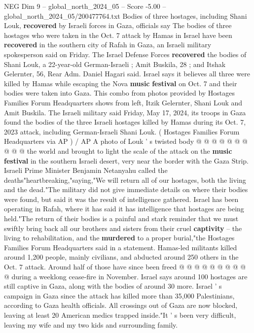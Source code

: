 \begin{textsample}{NEG Dim 9 – global\_north\_2024\_05 – Score -5.00 – global\_north\_2024\_05/200477764.txt}  \label{ex:f9_neg_239}
Bodies of three hostages, including Shani Louk, \textbf{recovered} by Israeli forces in Gaza, officials say The bodies of three hostages who were taken in the Oct. 7 attack by Hamas in Israel have been \textbf{recovered} in the southern city of Rafah in Gaza, an Israeli military spokesperson said on Friday.
The Israel Defense Forces \textbf{recovered} the bodies of Shani Louk, a 22-year-old German-Israeli ; Amit Buskila, 28 ; and Itshak Gelernter, 56, Rear Adm.
Daniel Hagari said.
Israel says it believes all three were killed by Hamas while escaping the Nova \textbf{music} \textbf{festival} on Oct. 7 and their bodies were taken into Gaza.
This combo from photos provided by Hostages Families Forum Headquarters shows from left, Itzik Gelernter, Shani Louk and Amit Buskila.
The Israeli military said Friday, May 17, 2024, its troops in Gaza found the bodies of the three Israeli hostages killed by Hamas during its Oct. 7, 2023 attack, including German-Israeli Shani Louk. ( Hostages Families Forum Headquarters via AP ) / AP A photo of Louk ' s twisted body @ @ @ @ @ @ @ @ @ @ the world and brought to light the scale of the attack on the \textbf{music} \textbf{festival} in the southern Israeli desert, very near the border with the Gaza Strip.
Israeli Prime Minister Benjamin Netanyahu called the deaths"heartbreaking,"saying,"We will return all of our hostages, both the living and the dead."The military did not give immediate details on where their bodies were found, but said it was the result of intelligence gathered.
Israel has been operating in Rafah, where it has said it has intelligence that hostages are being held."The return of their bodies is a painful and stark reminder that we must swiftly bring back all our brothers and sisters from their cruel \textbf{captivity} -- the living to rehabilitation, and the \textbf{murdered} to a proper burial,"the Hostages Families Forum Headquarters said in a statement.
Hamas-led militants killed around 1,200 people, mainly civilians, and abducted around 250 others in the Oct. 7 attack.
Around half of those have since been freed @ @ @ @ @ @ @ @ @ @ during a weeklong cease-fire in November.
Israel says around 100 hostages are still captive in Gaza, along with the bodies of around 30 more.
Israel ' s campaign in Gaza since the attack has killed more than 35,000 Palestinians, according to Gaza health officials.
All crossings out of Gaza are now blocked, leaving at least 20 American medics trapped inside."It ' s been very difficult, leaving my wife and my two kids and surrounding family.

\end{textsample}
